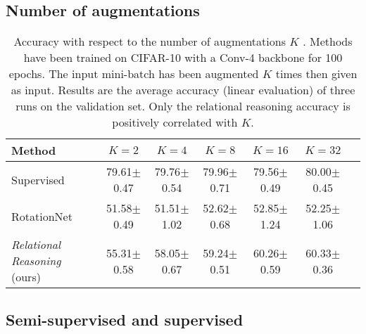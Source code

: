 \documentclass{article}
\begin{document}
\subsection{Number of augmentations}\label{appendix:number_augmentations}

\begin{table}[H]
 \caption{Accuracy with respect to the number of augmentations $K$ . Methods have been trained on CIFAR-10 with a Conv-4 backbone for 100 epochs. The input mini-batch has been augmented $K$ times then given as input. Results are the average accuracy (linear evaluation) of three runs on the validation set. Only the relational reasoning accuracy is positively correlated with $K$.}
 \label{tab:number_augmentations}
 \begin{adjustbox}{width=0.9\columnwidth,center}
  \centering
  \begin{tabular}{lcccccc}
    \toprule
    \textbf{Method} &
    $K=2$ & $K=4$ & $K=8$ & $K=16$ & $K=32$\\
    \midrule
    Supervised & 
    79.61$\pm$\small{0.47} & 79.76$\pm$\small{0.54} & 79.96$\pm$\small{0.71} & 79.56$\pm$\small{0.49} &
    80.00$\pm$\small{0.45}\\
    RotationNet \citep{gidaris2018unsupervised} & 
    51.58$\pm$\small{0.49} & 51.51$\pm$\small{1.02} & 52.62$\pm$\small{0.68} & 52.85$\pm$\small{1.24} &
    52.25$\pm$\small{1.06}\\
    \emph{Relational Reasoning} (ours) & 
    55.31$\pm$\small{0.58} & 58.05$\pm$\small{0.67} & 59.24$\pm$\small{0.51} & 60.26$\pm$\small{0.59} &
    60.33$\pm$\small{0.36} \\
    \bottomrule
  \end{tabular}
 \end{adjustbox}
\end{table}


\subsection{Semi-supervised and supervised}\label{appendix:semisupervised}
\end{document}
